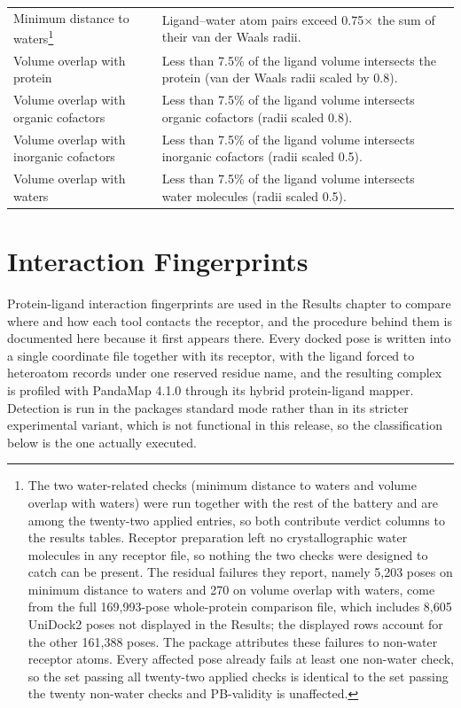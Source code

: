 \begin{longtable}[]{@{}
  >{\raggedright\arraybackslash}p{}
  >{\raggedright\arraybackslash}p{}@{}}
Minimum distance to waters\footnote{The two water-related checks (minimum distance to waters and volume overlap with waters) were run together with the rest of the battery and are among the twenty-two applied entries, so both contribute verdict columns to the results tables. Receptor preparation left no crystallographic water molecules in any receptor file, so nothing the two checks were designed to catch can be present. The residual failures they report, namely 5,203 poses on minimum distance to waters and 270 on volume overlap with waters, come from the full 169,993-pose whole-protein comparison file, which includes 8,605 UniDock2 poses not displayed in the Results; the displayed rows account for the other 161,388 poses. The package attributes these failures to non-water receptor atoms. Every affected pose already fails at least one non-water check, so the set passing all twenty-two applied checks is identical to the set passing the twenty non-water checks and PB-validity is unaffected.} & Ligand--water atom pairs exceed 0.75\ensuremath{\times} the sum of their van der Waals radii. \\
Volume overlap with protein & Less than 7.5\% of the ligand volume intersects the protein (van der Waals radii scaled by 0.8). \\
Volume overlap with organic cofactors & Less than 7.5\% of the ligand volume intersects organic cofactors (radii scaled 0.8). \\
Volume overlap with inorganic cofactors & Less than 7.5\% of the ligand volume intersects inorganic cofactors (radii scaled 0.5). \\
Volume overlap with waters & Less than 7.5\% of the ligand volume intersects water molecules (radii scaled 0.5). \\
\end{longtable}

\hypertarget{interaction-fingerprints}{%
\section{Interaction Fingerprints}\label{interaction-fingerprints}}

Protein-ligand interaction fingerprints are used in the Results chapter to compare where and how each tool contacts the receptor, and the procedure behind them is documented here because it first appears there. Every docked pose is written into a single coordinate file together with its receptor, with the ligand forced to heteroatom records under one reserved residue name, and the resulting complex is profiled with PandaMap 4.1.0 \cite{ref090} through its hybrid protein-ligand mapper. Detection is run in the package\textquotesingle s standard mode rather than in its stricter experimental variant, which is not functional in this release, so the classification below is the one actually executed.

